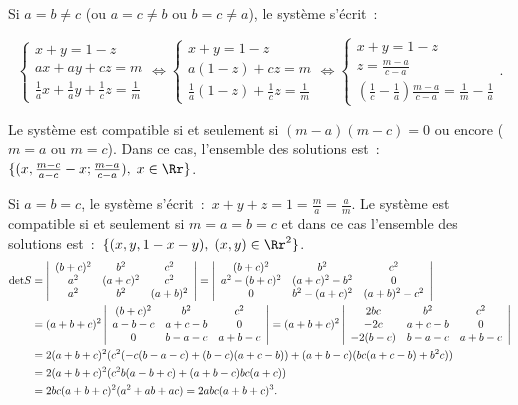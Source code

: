 {{Si $a=b\neq c$ (ou $a=c\neq b$ ou $b=c\neq a$), le système s'écrit~:

$$\left\{
\begin{array}{l}
x+y=1-z\\
ax+ay+cz=m\\
\frac{1}{a}x+\frac{1}{a}y+\frac{1}{c}z=\frac{1}{m}
\end{array}
\right.\Leftrightarrow\left\{
\begin{array}{l}
x+y=1-z\\
a(1-z)+cz=m\\
\frac{1}{a}(1-z)+\frac{1}{c}z=\frac{1}{m}
\end{array}
\right.\Leftrightarrow\left\{
\begin{array}{l}
x+y=1-z\\
z=\frac{m-a}{c-a}\\
(\frac{1}{c}-\frac{1}{a})\frac{m-a}{c-a}=\frac{1}{m}-\frac{1}{a}
\end{array}
\right..$$

Le système est compatible si et seulement si $(m-a)(m-c)=0$ ou encore ($m=a$ ou $m=c$). Dans ce cas, l'ensemble des solutions est~:~$\{(x,\frac{m-c}{a-c}-x;\frac{m-a}{c-a}),\;x\in\Rr\}$.

Si $a=b=c$, le système s'écrit~:~$x+y+z=1=\frac{m}{a}=\frac{a}{m}$. Le système est compatible si et seulement si $m=a=b=c$ et dans ce cas l'ensemble des solutions est~:~$\{(x,y,1-x-y),\;(x,y)\in\Rr^2\}$.
\begin{align*}\ensuremath
\mbox{det}S&=\left|
\begin{array}{ccc}
(b+c)^2&b^2&c^2\\
a^2&(a+c)^2&c^2\\
a^2&b^2&(a+b)^2
\end{array}
\right|=\left|
\begin{array}{ccc}
(b+c)^2&b^2&c^2\\
a^2-(b+c)^2&(a+c)^2-b^2&0\\
0&b^2-(a+c)^2&(a+b)^2-c^2
\end{array}
\right|\\
 &=(a+b+c)^2\left|
\begin{array}{ccc}
(b+c)^2&b^2&c^2\\
a-b-c&a+c-b&0\\
0&b-a-c&a+b-c
\end{array}
\right|=(a+b+c)^2\left|
\begin{array}{ccc}
2bc&b^2&c^2\\
-2c&a+c-b&0\\
-2(b-c)&b-a-c&a+b-c
\end{array}
\right|
\\
 &=2(a+b+c)^2(c^2(-c(b-a-c)+(b-c)(a+c-b))+(a+b-c)(bc(a+c-b)+b^2c))\\
 &=2(a+b+c)^2(c^2b(a-b+c)+(a+b-c)bc(a+c))\\
 &=2bc(a+b+c)^2(a^2+ab+ac)=2abc(a+b+c)^3.
\end{align*}

}}
